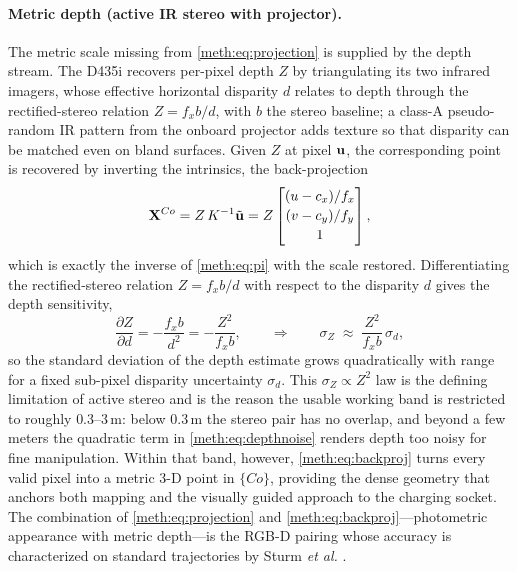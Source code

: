 \paragraph{Metric depth (active IR stereo with projector).}
The metric scale missing from \eqref{meth:eq:projection} is supplied by the depth stream. The D435i recovers per-pixel depth $Z$ by triangulating its two infrared imagers, whose effective horizontal disparity $d$ relates to depth through the rectified-stereo relation $Z = f_x b / d$, with $b$ the stereo baseline; a class-A pseudo-random IR pattern from the onboard projector adds texture so that disparity can be matched even on bland surfaces. Given $Z$ at pixel $\mathbf{u}$, the corresponding point is recovered by inverting the intrinsics, the back-projection
\begin{equation}
\mathbf{X}^{Co} = Z\,K^{-1}\tilde{\mathbf{u}}
= Z
\begin{bmatrix}
(u-c_x)/f_x \\[2pt]
(v-c_y)/f_y \\[2pt]
1
\end{bmatrix},
\label{meth:eq:backproj}
\end{equation}
which is exactly the inverse of \eqref{meth:eq:pi} with the scale restored. Differentiating the rectified-stereo relation $Z=f_x b / d$ with respect to the disparity $d$ gives the depth sensitivity,
\begin{equation}
\frac{\partial Z}{\partial d} = -\frac{f_x b}{d^{2}} = -\frac{Z^{2}}{f_x b},
\qquad\Longrightarrow\qquad
\sigma_Z \;\approx\; \frac{Z^{2}}{f_x b}\,\sigma_d,
\label{meth:eq:depthnoise}
\end{equation}
so the standard deviation of the depth estimate grows quadratically with range for a fixed sub-pixel disparity uncertainty $\sigma_d$. This $\sigma_Z\!\propto\!Z^{2}$ law is the defining limitation of active stereo and is the reason the usable working band is restricted to roughly \ensuremath{0.3\text{--}3\,\mathrm{m}}: below \ensuremath{0.3\,\mathrm{m}} the stereo pair has no overlap, and beyond a few meters the quadratic term in \eqref{meth:eq:depthnoise} renders depth too noisy for fine manipulation. Within that band, however, \eqref{meth:eq:backproj} turns every valid pixel into a metric 3-D point in $\{Co\}$, providing the dense geometry that anchors both mapping and the visually guided approach to the charging socket. The combination of \eqref{meth:eq:projection} and \eqref{meth:eq:backproj}---photometric appearance with metric depth---is the RGB-D pairing whose accuracy is characterized on standard trajectories by Sturm \emph{et al.} \cite{sturm_2012_rgbd_benchmark}.

